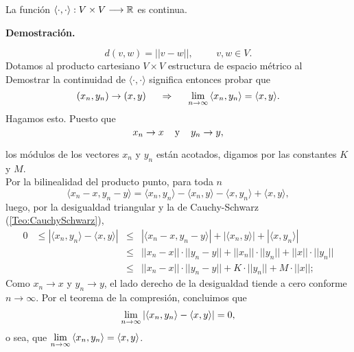 \begin{prop} \label{prop: continuidad del producto punto}
La función $\langle  \cdot , \cdot \rangle :
V \times V \longrightarrow \mathbb{R} $ es continua.
\end{prop}
\noindent
\textbf{Demostración.}

\[
d(v,w)= ||v-w||, \hspace{1cm} v, w \in V.
\]
Dotamos al producto cartesiano $V \times V $
estructura de espacio métrico al  \\


Demostrar la continuidad de 
$\langle  \cdot , \cdot \rangle$ significa entonces
probar que
\[
(x_{n}, y_{n}) \rightarrow (x,y) \hspace{0.5cm}
\Rightarrow \hspace{0.5cm} \lim\limits_{n \rightarrow \infty}{
\langle  x_{n} , y_{n} \rangle} = \langle  x , y \rangle .
\]
Hagamos esto. Puesto que
\[
x_{n} \rightarrow x \hspace{0.4cm} \text{y}
\hspace{0.4cm} y_{n} \rightarrow y, 
\]

\noindent
los módulos de los vectores $x_{n}$ y $y_{n}$ 
están acotados, digamos por las constantes $K$ y $M$. \\
Por la bilinealidad del producto punto, para toda $n$
\[
\langle x_{n}-x , y_{n}-y \rangle =
\langle x_{n}, y_{n}\rangle -
\langle x_{n} , y \rangle -
\langle x , y_{n} \rangle +
\langle x , y \rangle ,
\]
\noindent
luego, por la desigualdad triangular y la de Cauchy-Schwarz
(\ref{Teo:CauchySchwarz}),
\begin{align*}
0 & \leq |\langle x_{n}, y_{n}\rangle - \langle x , y \rangle|
& \leq & |\langle x_{n}-x , y_{n}-y \rangle| +
|\langle x_{n} , y \rangle| + |\langle x , y_{n} \rangle| \\
&& \leq & ||x_{n}-x|| \cdot ||y_{n}-y|| + ||x_{n}||\cdot ||y_{n}||
+||x|| \cdot ||y_{n}|| \\
&& \leq & ||x_{n}-x|| \cdot ||y_{n}-y|| + K\cdot ||y_{n}||
+M \cdot ||x||; 
\end{align*}
Como $x_{n} \rightarrow x$ y $y_{n} \rightarrow y$,
el lado derecho de la desigualdad tiende a cero
conforme $n \rightarrow \infty$. Por el teorema de la compresión,
concluimos que
\[
\lim\limits_{n \rightarrow \infty}{|\langle x_{n}, y_{n}\rangle - \langle x , y \rangle|}=0,
\]
o sea, que 
$ \lim\limits_{n \rightarrow \infty}{
\langle  x_{n} , y_{n} \rangle} = \langle  x , y \rangle$.
\QEDB
\vspace{0.2cm}


